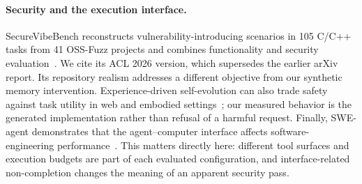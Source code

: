\paragraph{Security and the execution interface.}
SecureVibeBench reconstructs vulnerability-introducing scenarios in 105 C/C++ tasks from 41 OSS-Fuzz projects and combines functionality and security evaluation~\citep{securevibebench}. We cite its ACL 2026 version, which supersedes the earlier arXiv report. Its repository realism addresses a different objective from our synthetic memory intervention. Experience-driven self-evolution can also trade safety against task utility in web and embodied settings~\citep{experience_safety}; our measured behavior is the generated implementation rather than refusal of a harmful request. Finally, SWE-agent demonstrates that the agent--computer interface affects software-engineering performance~\citep{sweagent}. This matters directly here: different tool surfaces and execution budgets are part of each evaluated configuration, and interface-related non-completion changes the meaning of an apparent security pass.
